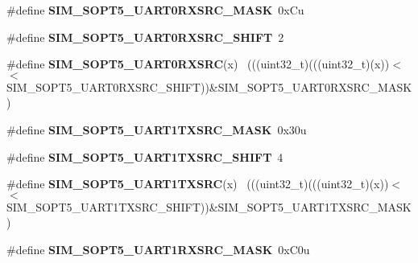 \begin{DoxyCompactItemize}
\item 
\hypertarget{group___s_i_m___register___masks_ga6160de3cd4b7169ac9095c0d0eee46f7}{}\#define {\bfseries S\+I\+M\+\_\+\+S\+O\+P\+T5\+\_\+\+U\+A\+R\+T0\+R\+X\+S\+R\+C\+\_\+\+M\+A\+S\+K}~0x\+Cu\label{group___s_i_m___register___masks_ga6160de3cd4b7169ac9095c0d0eee46f7}

\item 
\hypertarget{group___s_i_m___register___masks_ga27e87f2f792b880bd156907ab20e9910}{}\#define {\bfseries S\+I\+M\+\_\+\+S\+O\+P\+T5\+\_\+\+U\+A\+R\+T0\+R\+X\+S\+R\+C\+\_\+\+S\+H\+I\+F\+T}~2\label{group___s_i_m___register___masks_ga27e87f2f792b880bd156907ab20e9910}

\item 
\hypertarget{group___s_i_m___register___masks_gae1482daef7671b82d865a1cefd37c8de}{}\#define {\bfseries S\+I\+M\+\_\+\+S\+O\+P\+T5\+\_\+\+U\+A\+R\+T0\+R\+X\+S\+R\+C}(x)                                ~(((uint32\+\_\+t)(((uint32\+\_\+t)(x))$<$$<$S\+I\+M\+\_\+\+S\+O\+P\+T5\+\_\+\+U\+A\+R\+T0\+R\+X\+S\+R\+C\+\_\+\+S\+H\+I\+F\+T))\&S\+I\+M\+\_\+\+S\+O\+P\+T5\+\_\+\+U\+A\+R\+T0\+R\+X\+S\+R\+C\+\_\+\+M\+A\+S\+K)\label{group___s_i_m___register___masks_gae1482daef7671b82d865a1cefd37c8de}

\item 
\hypertarget{group___s_i_m___register___masks_gac473b632c382f785d524c177ff186e0d}{}\#define {\bfseries S\+I\+M\+\_\+\+S\+O\+P\+T5\+\_\+\+U\+A\+R\+T1\+T\+X\+S\+R\+C\+\_\+\+M\+A\+S\+K}~0x30u\label{group___s_i_m___register___masks_gac473b632c382f785d524c177ff186e0d}

\item 
\hypertarget{group___s_i_m___register___masks_ga7714c11e5536dacc90fbc2960e532e94}{}\#define {\bfseries S\+I\+M\+\_\+\+S\+O\+P\+T5\+\_\+\+U\+A\+R\+T1\+T\+X\+S\+R\+C\+\_\+\+S\+H\+I\+F\+T}~4\label{group___s_i_m___register___masks_ga7714c11e5536dacc90fbc2960e532e94}

\item 
\hypertarget{group___s_i_m___register___masks_ga06c2c7dfca35c10b5c05598c2c29e944}{}\#define {\bfseries S\+I\+M\+\_\+\+S\+O\+P\+T5\+\_\+\+U\+A\+R\+T1\+T\+X\+S\+R\+C}(x)                                ~(((uint32\+\_\+t)(((uint32\+\_\+t)(x))$<$$<$S\+I\+M\+\_\+\+S\+O\+P\+T5\+\_\+\+U\+A\+R\+T1\+T\+X\+S\+R\+C\+\_\+\+S\+H\+I\+F\+T))\&S\+I\+M\+\_\+\+S\+O\+P\+T5\+\_\+\+U\+A\+R\+T1\+T\+X\+S\+R\+C\+\_\+\+M\+A\+S\+K)\label{group___s_i_m___register___masks_ga06c2c7dfca35c10b5c05598c2c29e944}

\item 
\hypertarget{group___s_i_m___register___masks_gaf34eb14baf5894693130af7addd8aa6f}{}\#define {\bfseries S\+I\+M\+\_\+\+S\+O\+P\+T5\+\_\+\+U\+A\+R\+T1\+R\+X\+S\+R\+C\+\_\+\+M\+A\+S\+K}~0x\+C0u\label{group___s_i_m___register___masks_gaf34eb14baf5894693130af7addd8aa6f}


\end{DoxyCompactItemize}
